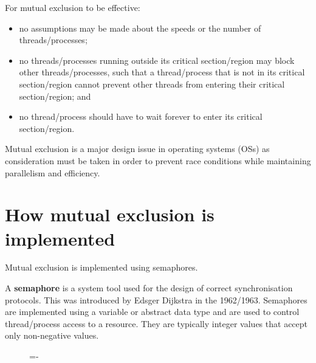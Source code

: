 \documentclass[a4paper]{systems-software}
\begin{document}
For mutual exclusion to be effective:
\begin{itemize}
	\item no assumptions may be made about the speeds or the number of threads/processes;
	\item no threads/processes running outside its critical section/region may block other threads/processes, such that a thread/process that is not in its critical section/region cannot prevent other threads from entering their critical section/region; and
	\item no thread/process should have to wait forever to enter its critical section/region.
\end{itemize}

Mutual exclusion is a major design issue in operating systems (OSs) as consideration must be taken in order to prevent race conditions while maintaining parallelism and efficiency.


\section*{How mutual exclusion is implemented}

Mutual exclusion is implemented using semaphores.

A \textbf{semaphore} is a system tool used for the design of correct synchronisation protocols. This was introduced by Edsger Dijkstra in the 1962/1963. Semaphores are implemented using a variable or abstract data type and are used to control thread/process access to a resource. They are typically integer values that accept only non-negative values.

\begin{figure}[H]
  \lineskip=-\fboxrule
\end{figure}
\end{document}
